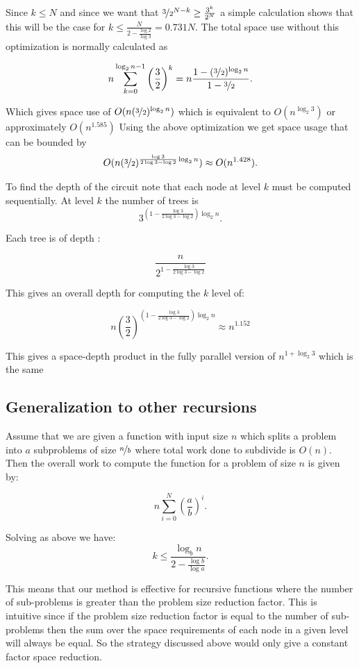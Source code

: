 Since $k\leq N$ and since we want that $\nicefrac{3}{2}^{N-k} \geq
\frac{3^k}{2^N}$ a simple calculation shows that this will be the case for $k
\leq \frac{N}{ 2- \frac{\log 2}{\log 3}} = 0.731N$. The total space use without
this optimization is normally calculated as

\[
    n\sum_{k=0}^{\log_2 n - 1} \left(\frac{3}{2}\right)^k = n\frac{1-(\nicefrac{3}{2})^{\log_2 n}}{1-\nicefrac{3}{2}}.
\]

Which gives space use of $O(n(\nicefrac{3}{2})^{\log_2 n})$ which is
equivalent to $O(n^{\log_2 3})$ or approximately $O(n^{1.585})$
Using the above optimization we get space usage that can be bounded by
\[
    O(n(\nicefrac{3}{2})^{\frac{\log 3}{ 2\log 3 - \log 2}\log_2 n}) \approx O(n^{1.428}).
\]

To find the depth of the circuit note that each node at level $k$ must be
computed sequentially. At level $k$ the number of trees is
\[
    3^{\left(1-\frac{\log 3}{ 2\log 3 - \log 2}\right)\log_2 n}.
\]

Each tree is of depth :

\[
    \frac{n}{2^{1-\frac{\log 3}{ 2\log 3 - \log 2}}}
\]

This gives an overall depth for computing the $k$ level of:

\[
    n\left(\frac{3}{2}\right)^{\left(1-\frac{\log 3}{ 2\log 3 - \log 2}\right)\log_2 n} \approx n^{1.152}
\]

This gives a space-depth product in the fully parallel version of $n^{1+\log_2
3}$ which is the same

\subsection{Generalization to other recursions\label{sec:recpeb}}

Assume that we are given a function with input size $n$ which splits a problem
into $a$ subproblems of size $\nicefrac{n}{b}$ where total work done to
subdivide is $O(n)$. Then the overall work to compute the function for a
problem of size $n$ is given by:

\[
    n\sum_{i=0}^{N} \left(\frac{a}{b}\right)^i.
\]

Solving as above we have:
\[
    k \leq \frac{\log_b n}{ 2- \frac{\log b}{\log a}}.
\]

This means that our method is effective for recursive functions where the
number of sub-problems is greater than the problem size reduction factor. This
is intuitive since if the problem size reduction factor is equal to the number
of sub-problems then the sum over the space requirements of each node in a
given level will always be equal. So the strategy discussed above would only
give a constant factor space reduction.


